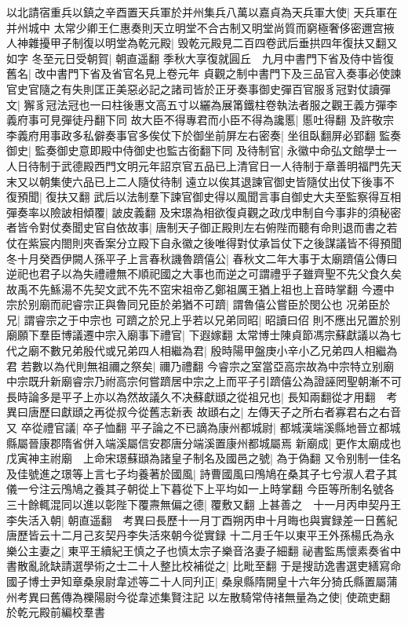 以北請宿重兵以鎮之辛酉置天兵軍於并州集兵八萬以嘉貞為天兵軍大使|{
	天兵軍在并州城中}
太常少卿王仁惠奏則天立明堂不合古制又明堂尚質而窮極奢侈密邇宫掖人神雜擾甲子制復以明堂為乾元殿|{
	毁乾元殿見二百四卷武后垂拱四年復扶又翻又如字}
冬至元日受朝賀|{
	朝直遥翻}
季秋大享復就圓丘　九月中書門下省及侍中皆復舊名|{
	改中書門下省及省官名見上卷元年}
貞觀之制中書門下及三品官入奏事必使諫官史官隨之有失則匡正美惡必記之諸司皆於正牙奏事御史彈百官服豸冠對仗讀彈文|{
	獬豸冠法冠也一曰柱後惠文高五寸以纚為展筩鐵柱卷執法者服之觀王義方彈李義府事可見彈徒丹翻下同}
故大臣不得專君而小臣不得為讒慝|{
	慝吐得翻}
及許敬宗李義府用事政多私僻奏事官多俟仗下於御坐前屏左右密奏|{
	坐徂臥翻屏必郢翻}
監奏御史|{
	監奏御史意即殿中侍御史也監古銜翻下同}
及待制官|{
	永徽中命弘文館學士一人日待制于武德殿西門文明元年詔京官五品已上清官日一人待制于章善明福門先天末又以朝集使六品已上二人隨仗待制}
遠立以俟其退諫官御史皆隨仗出仗下後事不復預聞|{
	復扶又翻}
武后以法制羣下諫官御史得以風聞言事自御史大夫至監察得互相彈奏率以險詖相傾覆|{
	詖皮義翻}
及宋璟為相欲復貞觀之政戊申制自今事非的須秘密者皆令對仗奏聞史官自依故事|{
	唐制天子御正殿則左右俯陛而聽有命則退而書之若仗在紫宸内閤則夾香案分立殿下自永徽之後唯得對仗承旨仗下之後謀議皆不得預聞}
冬十月癸酉伊闕人孫平子上言春秋譏魯躋僖公|{
	春秋文二年大事于太廟躋僖公傳曰逆祀也君子以為失禮禮無不順祀國之大事也而逆之可謂禮乎子雖齊聖不先父食久矣故禹不先鯀湯不先契文武不先不窋宋祖帝乙鄭祖厲王猶上祖也上音時掌翻}
今遷中宗於别廟而祀睿宗正與魯同兄臣於弟猶不可躋|{
	謂魯僖公嘗臣於閔公也}
况弟臣於兄|{
	謂睿宗之于中宗也}
可躋之於兄上乎若以兄弟同昭|{
	昭讀曰佋}
則不應出兄置於别廟願下羣臣博議遷中宗入廟事下禮官|{
	下遐嫁翻}
太常博士陳貞節馮宗蘇獻議以為七代之廟不數兄弟殷代或兄弟四人相繼為君|{
	殷時陽甲盤庚小辛小乙兄弟四人相繼為君}
若數以為代則無祖禰之祭矣|{
	禰乃禮翻}
今睿宗之室當亞高宗故為中宗特立别廟中宗既升新廟睿宗乃祔高宗何嘗躋居中宗之上而平子引躋僖公為證誣罔聖朝漸不可長時論多是平子上亦以為然故議久不决蘇獻頲之從祖兄也|{
	長知兩翻從才用翻　考異曰唐歷曰獻頲之再從叔今從舊志新表}
故頲右之|{
	左傳天子之所右者寡君右之右音又}
卒從禮官議|{
	卒子恤翻}
平子論之不已謫為康州都城尉|{
	都城漢端溪縣地晉立都城縣屬晉康郡隋省併入端溪屬信安郡唐分端溪置康州都城屬焉}
新廟成|{
	更作太廟成也}
戊寅神主祔廟　上命宋璟蘇頲為諸皇子制名及國邑之號|{
	為于偽翻}
又令别制一佳名及佳號進之璟等上言七子均養著於國風|{
	詩曹國風曰鳲鳩在桑其子七兮淑人君子其儀一兮注云鳲鳩之養其子朝從上下暮從下上平均如一上時掌翻}
今臣等所制名號各三十餘輒混同以進以彰陛下覆燾無偏之德|{
	覆敷又翻}
上甚善之　十一月丙申契丹王李失活入朝|{
	朝直遥翻　考異曰長歷十一月丁酉朔丙申十月晦也與實録差一日舊紀唐歷皆云十二月己亥契丹李失活來朝今從實録}
十二月壬午以東平王外孫楊氏為永樂公主妻之|{
	東平王續紀王慎之子也慎太宗子樂音洛妻子細翻}
祕書監馬懷素奏省中書散亂訛缺請選學術之士二十人整比校補從之|{
	比毗至翻}
于是搜訪逸書選吏繕寫命國子博士尹知章桑泉尉韋述等二十人同刋正|{
	桑泉縣隋開皇十六年分猗氏縣置屬蒲州考異曰舊傳為櫟陽尉今從韋述集賢注記}
以左散騎常侍禇無量為之使|{
	使疏吏翻}
於乾元殿前編校羣書

